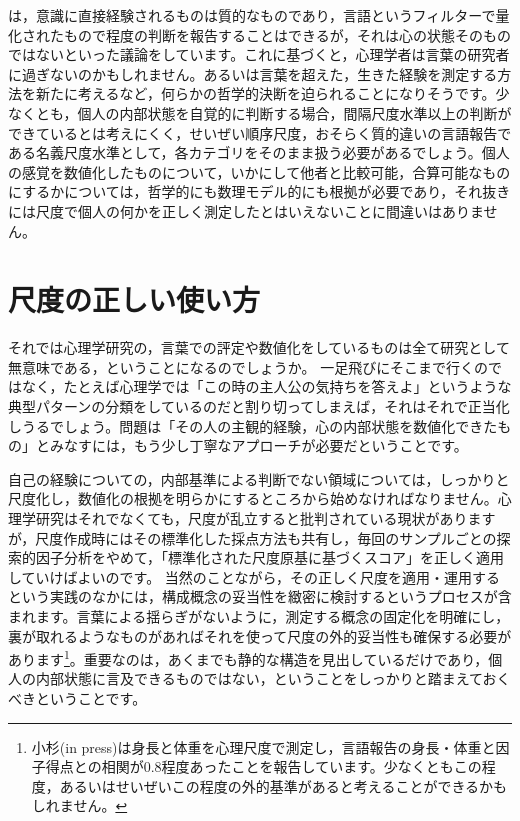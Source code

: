 \documentclass{ltjsbook}
\begin{document}
\citet{Bergson2002}は，意識に直接経験されるものは質的なものであり，言語というフィルターで量化されたもので程度の判断を報告することはできるが，それは心の状態そのものではないといった議論をしています。これに基づくと，心理学者は言葉の研究者に過ぎないのかもしれません。あるいは言葉を超えた，生きた経験を測定する方法を新たに考えるなど，何らかの哲学的決断を迫られることになりそうです。少なくとも，個人の内部状態を自覚的に判断する場合，間隔尺度水準以上の判断ができているとは考えにくく，せいぜい順序尺度，おそらく質的違いの言語報告である名義尺度水準として，各カテゴリをそのまま扱う必要があるでしょう。個人の感覚を数値化したものについて，いかにして他者と比較可能，合算可能なものにするかについては，哲学的にも数理モデル的にも根拠が必要であり，それ抜きには尺度で個人の何かを正しく測定したとはいえないことに間違いはありません。

\section{尺度の正しい使い方}
それでは心理学研究の，言葉での評定や数値化をしているものは全て研究として無意味である，ということになるのでしょうか。
一足飛びにそこまで行くのではなく，たとえば心理学では「この時の主人公の気持ちを答えよ」というような典型パターンの分類をしているのだと割り切ってしまえば，それはそれで正当化しうるでしょう。問題は「その人の主観的経験，心の内部状態を数値化できたもの」とみなすには，もう少し丁寧なアプローチが必要だということです。

自己の経験についての，内部基準による判断でない領域については，しっかりと尺度化し，数値化の根拠を明らかにするところから始めなければなりません。心理学研究はそれでなくても，尺度が乱立すると批判されている現状がありますが，尺度作成時にはその標準化した採点方法も共有し，毎回のサンプルごとの探索的因子分析をやめて，「標準化された尺度原基に基づくスコア」を正しく適用していけばよいのです。
当然のことながら，その正しく尺度を適用・運用するという実践のなかには，構成概念の妥当性を緻密に検討するというプロセスが含まれます。言葉による揺らぎがないように，測定する概念の固定化を明確にし，裏が取れるようなものがあればそれを使って尺度の外的妥当性も確保する必要があります\footnote{小杉(in press)は身長と体重を心理尺度で測定し，言語報告の身長・体重と因子得点との相関が0.8程度あったことを報告しています。少なくともこの程度，あるいはせいぜいこの程度の外的基準があると考えることができるかもしれません。}。重要なのは，あくまでも静的な構造を見出しているだけであり，個人の内部状態に言及できるものではない，ということをしっかりと踏まえておくべきということです。
\end{document}

